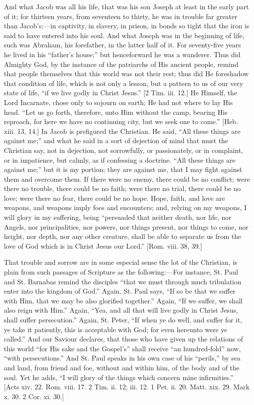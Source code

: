 And what Jacob was all his life, that was his son Joseph at least
in the early part of it; for thirteen years, from seventeen to thirty,
he was in trouble far greater than Jacob's;—in captivity, in
slavery, in prison, in bonds so tight that the iron is said to have
entered into his soul. And what Joseph was in the beginning of life,
such was Abraham, his forefather, in the latter half of it. For
seventy-five years he lived in his ``father's house;'' but
henceforward he was a wanderer. Thus did Almighty God, by the instance
of the patriarchs of His ancient people, remind that people themselves
that this world was not their rest; thus did He foreshadow that
condition of life, which is not only a lesson, but a pattern to us of
our very state of life, ``if we live godly in Christ Jesus.''
[2 Tim. iii. 12.] He Himself, the Lord Incarnate, chose only to
sojourn on earth; He had not where to lay His head. ``Let us go
forth, therefore, unto Him without the camp, bearing His reproach, for
here we have no continuing city, but we seek one to come.'' [Heb.
xiii. 13, 14.] In Jacob is prefigured the Christian. He said,
``All these things are against me;'' and what he said in a
sort of dejection of mind that must the Christian say, not in
dejection, not sorrowfully, or passionately, or in complaint, or in
impatience, but calmly, as if confessing a doctrine. ``All these
things are against me;'' but it is my portion; they are against
me, that I may fight against them and overcome them. If there were no
enemy, there could be no conflict; were there no trouble, there could
be no faith; were there no trial, there could be no love; were there
no fear, there could be no hope. Hope, faith, and love are weapons,
and weapons imply foes and encounters; and, relying on my weapons, I
will glory in my suffering, being ``persuaded that neither death,
nor life, nor Angels, nor principalities, nor powers, nor things
present, nor things to come, nor height, nor depth, nor any other
creature, shall be able to separate us from the love of God which is
in Christ Jesus our Lord.'' [Rom. viii. 38, 39.]

That trouble and sorrow are in some especial sense the lot of the
Christian, is plain from such passages of Scripture as the following:—For
instance, St. Paul and St. Barnabas remind the disciples ``that we
must through much tribulation enter into the kingdom of God.''
Again, St. Paul says, ``If so be that we suffer with Him, that we
may be also glorified together.'' Again, ``If we suffer, we
shall also reign with Him.'' Again, ``Yea, and all that will
live godly in Christ Jesus, shall suffer persecution.'' Again, St.
Peter, ``If when ye do well, and suffer for it, ye take it
patiently, this is acceptable with God; for even hereunto were ye
called.'' And our Saviour declares, that those who have given up
the relations of this world ``for His sake and the Gospel's''
shall receive ``an hundred-fold'' now, ``with
persecutions.'' And St. Paul speaks in his own case of his
``perils,'' by sea and land, from friend and foe, without and
within him, of the body and of the soul. Yet he adds, ``I will
glory of the things which concern mine infirmities.'' [Acts xiv.
22. Rom. viii. 17. 2 Tim. ii. 12; iii. 12. 1 Pet. ii. 20. Matt. xix.
29. Mark x. 30. 2 Cor. xi. 30.]


